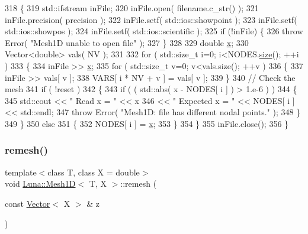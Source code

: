 \begin{DoxyCode}
318     \{
319         std::ifstream inFile;
320         inFile.open( filename.c\_str() );
321         inFile.precision( precision );
322         inFile.setf( std::ios::showpoint );
323         inFile.setf( std::ios::showpos );
324         inFile.setf( std::ios::scientific );
325         \textcolor{keywordflow}{if} (!inFile) \{
326             \textcolor{keywordflow}{throw} Error( \textcolor{stringliteral}{"Mesh1D unable to open file"} );
327         \}
328 
329         \textcolor{keywordtype}{double} \hyperlink{namespaceHeat__plot_aa88370c16b85b784ccbde3ed88bc1991}{x};
330         Vector<double> vals( NV );
331 
332         \textcolor{keywordflow}{for} ( std::size\_t i=0; i<NODES.\hyperlink{classLuna_1_1Vector_ac9b6ed7a0df401728f27c193fbc8f4d8}{size}(); ++i )
333         \{
334             inFile >> \hyperlink{namespaceHeat__plot_aa88370c16b85b784ccbde3ed88bc1991}{x};
335             \textcolor{keywordflow}{for} ( std::size\_t v=0; v<vals.size(); ++v )
336             \{
337                 inFile >> vals[ v ];
338                 VARS[ i * NV + v ] = vals[ v ];
339             \}
340             \textcolor{comment}{// Check the mesh}
341             \textcolor{keywordflow}{if} ( !reset )
342             \{
343                 \textcolor{keywordflow}{if} ( ( std::abs( x - NODES[ i ] ) > 1.e-6 ) )
344                 \{
345                     std::cout << \textcolor{stringliteral}{" Read x = "} << x
346                     << \textcolor{stringliteral}{" Expected x = "} << NODES[ i ] << std::endl;
347                     \textcolor{keywordflow}{throw} Error( \textcolor{stringliteral}{"Mesh1D: file has different nodal points."} );
348                 \}
349             \}
350             \textcolor{keywordflow}{else}
351             \{
352                 NODES[ i ] = \hyperlink{namespaceHeat__plot_aa88370c16b85b784ccbde3ed88bc1991}{x};
353             \}
354         \}
355         inFile.close();
356     \}
\end{DoxyCode}
\mbox{\label{classLuna_1_1Mesh1D_ac4df77e9ee7aeb4dbcf4dec8edd1a4c3}} 
\subsubsection{\texorpdfstring{remesh()}{remesh()}\hspace{0.1cm}{\footnotesize\ttfamily [1/4]}}
{\footnotesize\ttfamily template$<$class T, class X = double$>$ \\
void \hyperlink{classLuna_1_1Mesh1D}{Luna\+::\+Mesh1D}$<$ T, X $>$\+::remesh (\begin{DoxyParamCaption}\item[{const \hyperlink{classLuna_1_1Vector}{Vector}$<$ X $>$ \&}]{z }\end{DoxyParamCaption})}



